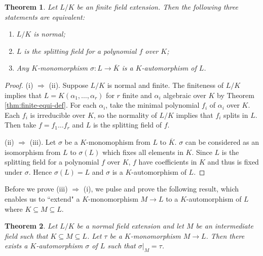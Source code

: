 \documentclass[12pt]{article}
\newtheorem{theorem}{Theorem}
\theoremstyle{definition}
\begin{document}
\begin{theorem} \label{thm:normal-equiv-def}
    Let $L/K$ be an finite field extension. Then the following three statements are equivalent:
    \begin{enumerate}[label=(\roman*)]
        \item $L/K$ is normal;
        \item $L$ is the splitting field for a polynomial $f$ over $K$;
        \item Any $K$-monomorphism $\sigma: L \to \overline K$ is a $K$-automorphism of $L$. 
    \end{enumerate}
\end{theorem}

\begin{proof}
    (i) $\Rightarrow$ (ii). 
    Suppose $L/K$ is normal and finite. The finiteness of $L/K$ implies that $L = K(\alpha_1, \dots, \alpha_r)$ for $r$ finite and $\alpha_i$ algebraic over $K$ by Theorem \ref{thm:finite-equi-def}. For each $\alpha_i$, take the minimal polynomial $f_i$ of $\alpha_i$ over $K$. Each $f_i$ is irreducible over $K$, so the normality of $L/K$ implies that $f_i$ splits in $L$.  Then take $f = f_1 \dots f_r$ and $L$ is the splitting field of $f$.
	
    

    (ii) $\Rightarrow$ (iii). Let $\sigma$ be a $K$-monomophism from $L$ to $\overline K$. $\sigma$ can be considered as an isomorphism from $L$ to $\sigma(L)$ which fixes all elements in $K$. Since $L$ is the splitting field for a polynomial $f$ over $K$, $f$ have coefficients in $K$ and thus is fixed under $\sigma$. Hence $\sigma(L) = L$ and $\sigma$ is a $K$-automorphism of $L$. 
\end{proof}

Before we prove (iii) $\Rightarrow$ (i), we pulse and prove the following result, which enables us to ``extend" a $K$-monomorphism $M \to L$ to a $K$-automorphism of $L$ where $K \subseteq M \subseteq L$. 

\begin{theorem} \label{thm:monomorphism-extend-automorphism}
	Let $L/K$ be a normal field extension and let $M$ be an intermediate field such that $K \subseteq M \subseteq L$. Let $\tau$ be a $K$-monomorphism $M \to L$. Then there exists a $K$-automorphism $\sigma$ of $L$ such that $\sigma | _M = \tau$.  
\end{theorem}
\end{document}
